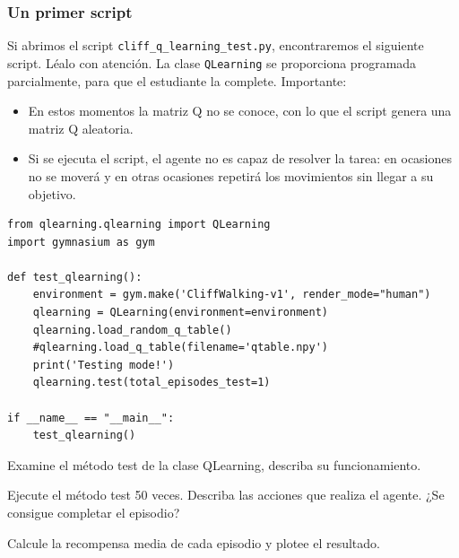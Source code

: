 \documentclass{article}
\begin{document}
\subsubsection{Un primer script}
Si abrimos el script \texttt{cliff\_q\_learning\_test.py}, encontraremos el siguiente script. Léalo con atención. La clase \texttt{QLearning} se proporciona programada parcialmente, para que el estudiante la complete. Importante:
\begin{itemize}
    \item En estos momentos la matriz Q no se conoce, con lo que el script genera una matriz Q aleatoria.
    \item Si se ejecuta el script, el agente no es capaz de resolver la tarea: en ocasiones no se moverá y en otras ocasiones repetirá los movimientos sin llegar a su objetivo.
\end{itemize}
\begin{verbatim}
from qlearning.qlearning import QLearning
import gymnasium as gym

def test_qlearning():
    environment = gym.make('CliffWalking-v1', render_mode="human")
    qlearning = QLearning(environment=environment)
    qlearning.load_random_q_table()
    #qlearning.load_q_table(filename='qtable.npy')
    print('Testing mode!')
    qlearning.test(total_episodes_test=1)

if __name__ == "__main__":
    test_qlearning()
\end{verbatim}



\begin{exercise}
Examine el método test de la clase QLearning, describa su funcionamiento.
\end{exercise}

\begin{exercise}
Ejecute el método test 50 veces. Describa las acciones que realiza el agente. ¿Se consigue completar el episodio?
\end{exercise}

\begin{exercise}
Calcule la recompensa media de cada episodio y plotee el resultado.
\end{exercise}
\end{document}
